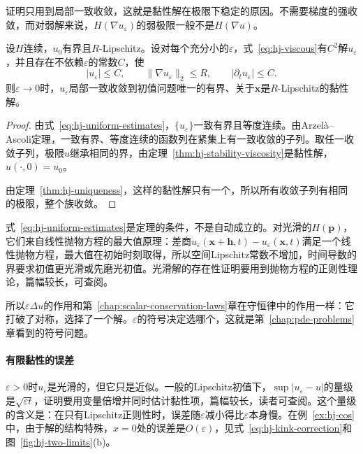 证明只用到局部一致收敛，这就是黏性解在极限下稳定的原因。不需要梯度的强收敛，而对弱解来说，$H(\nabla u_\varepsilon)$的弱极限一般不是$H(\nabla u)$。

\begin{theorem}[消失黏性选择黏性解]
\label{thm:hj-vanishing-viscosity}
设$H$连续，$u_0$有界且$R$-Lipschitz。设对每个充分小的$\varepsilon$，式~\eqref{eq:hj-viscous}有$C^2$解$u_\varepsilon$，并且存在不依赖$\varepsilon$的常数$C$，使
\begin{equation}
  \lvert u_\varepsilon\rvert\leq C,\qquad\lVert\nabla u_\varepsilon\rVert_2\leq R,\qquad\lvert\partial_tu_\varepsilon\rvert\leq C.
  \label{eq:hj-uniform-estimates}
\end{equation}
则$\varepsilon\to0$时，$u_\varepsilon$局部一致收敛到初值问题唯一的有界、关于$\bm{x}$是$R$-Lipschitz的黏性解。
\end{theorem}

\begin{proof}
由式~\eqref{eq:hj-uniform-estimates}，$\{u_\varepsilon\}$一致有界且等度连续。由Arzel\`a--Ascoli定理，一致有界、等度连续的函数列在紧集上有一致收敛的子列。取任一收敛子列，极限$u$继承相同的界，由定理~\ref{thm:hj-stability-viscosity}是黏性解，$u(\cdot,0)=u_0$。

由定理~\ref{thm:hj-uniqueness}，这样的黏性解只有一个，所以所有收敛子列有相同的极限，整个族收敛。
\end{proof}

式~\eqref{eq:hj-uniform-estimates}是定理的条件，不是自动成立的。对光滑的$H(\bm{p})$，它们来自线性抛物方程的最大值原理：差商$u_\varepsilon(\bm{x}+\bm{h},t)-u_\varepsilon(\bm{x},t)$满足一个线性抛物方程，最大值在初始时刻取得，所以空间Lipschitz常数不增加，时间导数的界要求初值更光滑或先磨光初值。光滑解的存在性证明要用到抛物方程的正则性理论，篇幅较长，可查阅。

所以$\varepsilon\Delta u$的作用和第~\ref{chap:scalar-conservation-laws}章在守恒律中的作用一样：它打破了对称，选择了一个解。$\varepsilon$的符号决定选哪个，这就是第~\ref{chap:pde-problems}章看到的符号问题。

\paragraph{有限黏性的误差}
$\varepsilon>0$时$u_\varepsilon$是光滑的，但它只是近似。一般的Lipschitz初值下，$\sup\lvert u_\varepsilon-u\rvert$的量级是$\sqrt{\varepsilon t}$，证明要用变量倍增并同时估计黏性项，篇幅较长，读者可查阅。这个量级的含义是：在只有Lipschitz正则性时，误差随$\varepsilon$减小得比$\varepsilon$本身慢。在例~\ref{ex:hj-cos}中，由于解的结构特殊，$x=0$处的误差是$O(\varepsilon)$，见式~\eqref{eq:hj-kink-correction}和图~\ref{fig:hj-two-limits}(b)。

